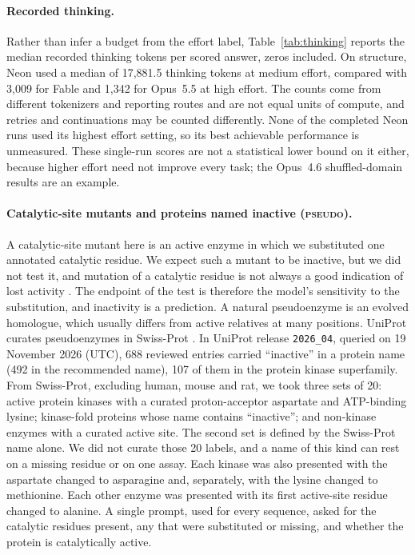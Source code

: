 \documentclass[11pt]{article}
\newcommand{\tpseudo}{\textmd{\textsc{pseudo}}}\newcommand{\tstrfn}{\textmd{\textsc{strfn}}}
\begin{document}
\paragraph{Recorded thinking.} Rather than infer a budget from the effort label,
Table~\ref{tab:thinking} reports the median recorded thinking tokens per scored answer, zeros included.
On structure, Neon used a median of 17,881.5 thinking tokens at medium effort, compared with 3,009 for
Fable and 1,342 for Opus~5.5 at high effort. The counts come from different tokenizers and reporting
routes and are not equal units of compute, and retries and continuations may be counted differently.
None of the completed Neon runs used its highest effort setting, so its best achievable performance is
unmeasured. These single-run scores are not a statistical lower bound on it either, because higher
effort need not improve every task; the Opus~4.6 shuffled-domain results are an example.

\paragraph{Catalytic-site mutants and proteins named inactive (\tpseudo).} A catalytic-site mutant here
is an active enzyme in which we substituted one annotated catalytic residue. We expect such a mutant to be
inactive, but we did not test it, and mutation of a catalytic residue is not always a good indication of
lost activity \citep{ribeiro2020pitfalls}. The endpoint of the test is therefore the model's sensitivity
to the substitution, and inactivity is a prediction. A natural pseudoenzyme is an evolved homologue, which
usually differs from active relatives at many positions. UniProt curates pseudoenzymes in Swiss-Prot
\citep{zaru2020uniprot}. In UniProt release \texttt{2026\_04}, queried on 19 November 2026 (UTC), 688
reviewed entries carried ``inactive'' in a protein name (492 in the recommended name), 107 of them in the
protein kinase superfamily. From Swiss-Prot, excluding human, mouse and rat, we took three sets of 20:
active protein kinases with a curated proton-acceptor aspartate and ATP-binding lysine; kinase-fold
proteins whose name contains ``inactive''; and non-kinase enzymes with a curated active site. The second
set is defined by the Swiss-Prot name alone. We did not curate those 20 labels, and a name of this kind
can rest on a missing residue or on one assay. Each kinase
was also presented with the aspartate changed to asparagine and, separately, with the lysine changed to
methionine. Each other enzyme was presented with its first active-site residue changed to alanine. A
single prompt, used for every sequence, asked for the catalytic residues present, any that were
substituted or missing, and whether the protein is catalytically active.
\end{document}
